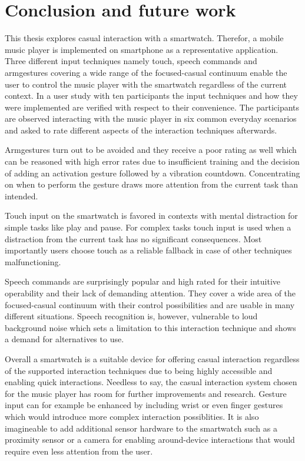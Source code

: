 \chapter{Conclusion and future work}\label{ch:conclusion}

This thesis explores casual interaction with a smartwatch. Therefor, a mobile music player is implemented on smartphone as a representative application. Three different input techniques namely touch, speech commands and armgestures covering a wide range of the focused-casual continuum enable the user to control the music player with the smartwatch regardless of the current context. In a user study with ten participants the input techniques and how they were implemented are verified with respect to their convenience. The participants are observed interacting with the music player in six common everyday scenarios and asked to rate different aspects of the interaction techniques afterwards.

Armgestures turn out to be avoided and they receive a poor rating as well which can be reasoned with high error rates due to insufficient training and the decision of adding an activation gesture followed by a vibration countdown. Concentrating on when to perform the gesture draws more attention from the current task than intended.

Touch input on the smartwatch is favored in contexts with mental distraction for simple tasks like play and pause. For complex tasks touch input is used when a distraction from the current task has no significant consequences. Most importantly users choose touch as a reliable fallback in case of other techniques malfunctioning.

Speech commands are surprisingly popular and high rated for their intuitive operability and their lack of demanding attention. They cover a wide area of the focused-casual continuum with their control possibilities and are usable in many different situations. Speech recognition is, however, vulnerable to loud background noise which sets a limitation to this interaction technique and shows a demand for alternatives to use.

Overall a smartwatch is a suitable device for offering casual interaction regardless of the supported interaction techniques due to being highly accessible and enabling quick interactions. Needless to say, the casual interaction system chosen for the music player has room for further improvements and research. Gesture input can for example be enhanced by including wrist or even finger gestures which would introduce more complex interaction possiblities. It is also imagineable to add additional sensor hardware to the smartwatch such as a proximity sensor or a camera for enabling around-device interactions that would require even less attention from the user.








